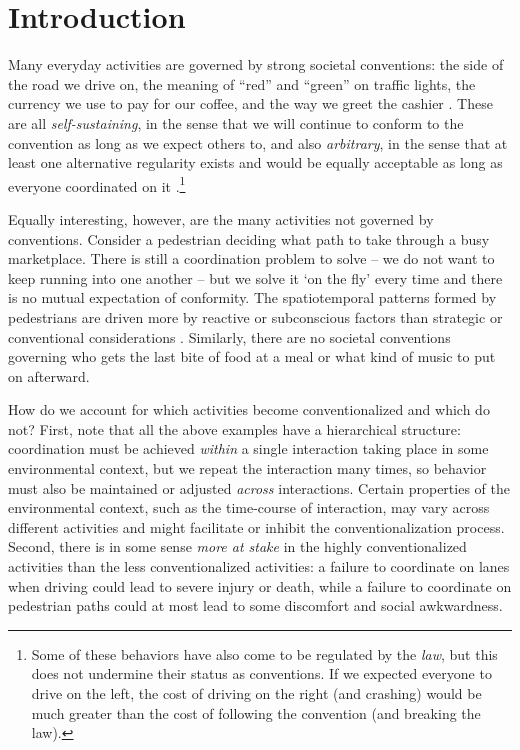 \documentclass[10pt,letterpaper]{article}
\begin{document}
\linenumbers

\section*{Introduction}
Many everyday activities are governed by strong societal conventions: the side of the road we drive on, the meaning of ``red'' and ``green'' on traffic lights, the currency we use to pay for our coffee, and the way we greet the cashier \cite{ClarkWilkesGibbs86_ReferringCollaborative, GarrodAnderson87_SayingWhatYouMean, CaldwellSmith12_Conventions, CentolaBaronchelli15_ConventionEmergence}. These are all \emph{self-sustaining}, in the sense that we will continue to conform to the convention as long as we expect others to, and also \emph{arbitrary}, in the sense that at least one alternative regularity exists and would be equally acceptable as long as everyone coordinated on it \cite{Lewis69_Convention}.\footnote{Some of these behaviors have also come to be regulated by the \emph{law}, but this does not undermine their status as conventions. If we expected everyone to drive on the left, the cost of driving on the right (and crashing) would be much greater than the cost of following the convention (and breaking the law).} 

Equally interesting, however, are the many activities not governed by conventions. Consider a pedestrian deciding what path to take through a busy marketplace. There is still a coordination problem to solve -- we do not want to keep running into one another -- but we solve it `on the fly' every time and there is no mutual expectation of conformity. The spatiotemporal patterns formed by pedestrians are driven more by reactive or subconscious factors than strategic or conventional considerations \cite{HelbingBuznaWerner05_PedestrianCrowdDynamics}. Similarly, there are no societal conventions governing who gets the last bite of food at a meal or what kind of music to put on afterward. 

How do we account for which activities become conventionalized and which do not? First, note that all the above examples have a hierarchical structure: coordination must be achieved \emph{within} a single interaction taking place in some environmental context, but we repeat the interaction many times, so behavior must also be maintained or adjusted \emph{across} interactions. Certain properties of the environmental context, such as the time-course of interaction, may vary across different activities and might facilitate or inhibit the conventionalization process. Second, there is in some sense \emph{more at stake} in the highly conventionalized activities than the less conventionalized activities: a failure to coordinate on lanes when driving could lead to severe injury or death, while a failure to coordinate on pedestrian paths could at most lead to some discomfort and social awkwardness.
\end{document}

